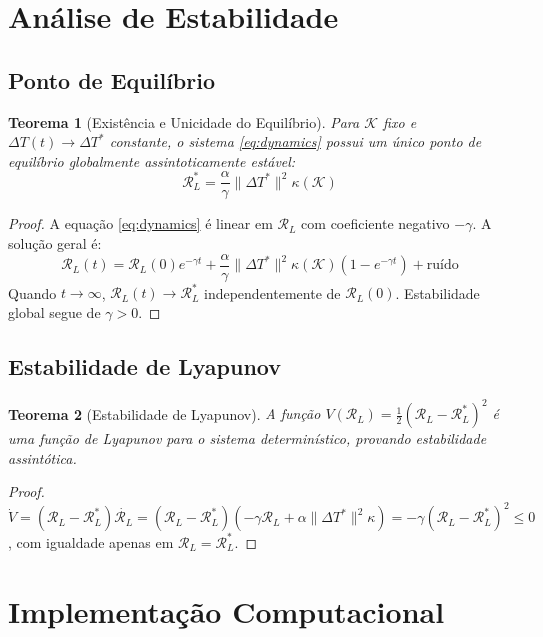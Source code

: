 \documentclass[11pt,a4paper]{article}
\newtheorem{theorem}{Teorema}[section]
\newcommand{\DeltaT}{\Delta T}
\newcommand{\RL}{\mathcal{R}_L}
\begin{document}
\section{Análise de Estabilidade}

\subsection{Ponto de Equilíbrio}

\begin{theorem}[Existência e Unicidade do Equilíbrio]
Para $\mathcal{K}$ fixo e $\DeltaT(t) \to \DeltaT^*$ constante, o sistema \eqref{eq:dynamics} possui um único ponto de equilíbrio globalmente assintoticamente estável:
\begin{equation}
    \RL^* = \frac{\alpha}{\gamma} \|\DeltaT^*\|^2 \kappa(\mathcal{K})
\end{equation}
\end{theorem}

\begin{proof}
A equação \eqref{eq:dynamics} é linear em $\RL$ com coeficiente negativo $-\gamma$. A solução geral é:
\begin{equation}
    \RL(t) = \RL(0)e^{-\gamma t} + \frac{\alpha}{\gamma}\|\DeltaT^*\|^2\kappa(\mathcal{K})(1 - e^{-\gamma t}) + \text{ruído}
\end{equation}
Quando $t \to \infty$, $\RL(t) \to \RL^*$ independentemente de $\RL(0)$. Estabilidade global segue de $\gamma > 0$.
\end{proof}

\subsection{Estabilidade de Lyapunov}

\begin{theorem}[Estabilidade de Lyapunov]
A função $V(\RL) = \frac{1}{2}(\RL - \RL^*)^2$ é uma função de Lyapunov para o sistema determinístico, provando estabilidade assintótica.
\end{theorem}

\begin{proof}
$\dot{V} = (\RL - \RL^*)\dot{\RL} = (\RL - \RL^*)(-\gamma\RL + \alpha\|\DeltaT^*\|^2\kappa) = -\gamma(\RL - \RL^*)^2 \le 0$, com igualdade apenas em $\RL = \RL^*$.
\end{proof}

\section{Implementação Computacional}
\end{document}
